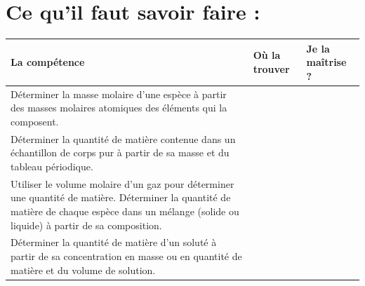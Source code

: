 \documentclass[a4paper,11pt,fleqn]{article}%
\begin{document}
	\section*{Ce qu'il faut savoir faire :}
	\begin{table}[h!]
		\begin{tabular}{|m{.6\linewidth}|m{.2\linewidth}|m{.1\linewidth}|}
			\hline
			\textbf{La compétence} & \textbf{Où la trouver} & \textbf{Je la maîtrise ?} \\
			\hline
			Déterminer la masse molaire d’une espèce à partir des masses molaires atomiques des éléments qui la composent. & & \\
			\hline
			Déterminer la quantité de matière contenue dans un échantillon de corps pur à partir de sa masse et du tableau périodique.& & \\
			\hline
			Utiliser le volume molaire d’un gaz pour déterminer une quantité de matière. Déterminer la quantité de matière de chaque espèce dans un mélange (solide ou liquide) à partir de sa composition.
			& & \\
			\hline
			Déterminer la quantité de matière d’un soluté à partir de sa concentration en masse ou en quantité de matière et du volume de solution. & & \\
			\hline
			
			
			
		\end{tabular}
	\end{table}
	
\end{document}
